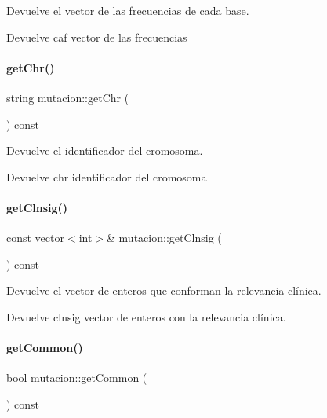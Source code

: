 Devuelve el vector de las frecuencias de cada base. 

\begin{DoxyReturn}{Devuelve}
caf vector de las frecuencias 
\end{DoxyReturn}
\hypertarget{classmutacion_a08cafaefc6dc2c49424c414dad7e823a}{}\label{classmutacion_a08cafaefc6dc2c49424c414dad7e823a} 
\paragraph{\texorpdfstring{get\+Chr()}{getChr()}}
{\footnotesize\ttfamily string mutacion\+::get\+Chr (\begin{DoxyParamCaption}{ }\end{DoxyParamCaption}) const}



Devuelve el identificador del cromosoma. 

\begin{DoxyReturn}{Devuelve}
chr identificador del cromosoma 
\end{DoxyReturn}
\hypertarget{classmutacion_a216068275eb221c01ce336de99b6d517}{}\label{classmutacion_a216068275eb221c01ce336de99b6d517} 
\paragraph{\texorpdfstring{get\+Clnsig()}{getClnsig()}}
{\footnotesize\ttfamily const vector$<$int$>$\& mutacion\+::get\+Clnsig (\begin{DoxyParamCaption}{ }\end{DoxyParamCaption}) const}



Devuelve el vector de enteros que conforman la relevancia clínica. 

\begin{DoxyReturn}{Devuelve}
clnsig vector de enteros con la relevancia clínica. 
\end{DoxyReturn}
\hypertarget{classmutacion_a8aef0548762119d1a4c0109477b3f182}{}\label{classmutacion_a8aef0548762119d1a4c0109477b3f182} 
\paragraph{\texorpdfstring{get\+Common()}{getCommon()}}
{\footnotesize\ttfamily bool mutacion\+::get\+Common (\begin{DoxyParamCaption}{ }\end{DoxyParamCaption}) const}



